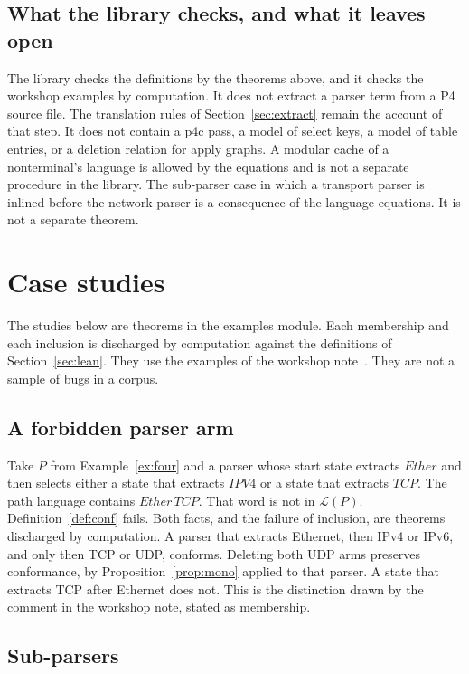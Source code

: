 \documentclass[a4paper,UKenglish,cleveref,autoref]{lipics-v2021}
\begin{document}
\subsection{What the library checks, and what it leaves open}

The library checks the definitions by the theorems above, and it checks the workshop examples by computation.
It does not extract a parser term from a P4 source file.
The translation rules of Section~\ref{sec:extract} remain the account of that step.
It does not contain a p4c pass, a model of select keys, a model of table entries, or a deletion relation for apply graphs.
A modular cache of a nonterminal's language is allowed by the equations and is not a separate procedure in the library.
The sub-parser case in which a transport parser is inlined before the network parser is a consequence of the language equations.
It is not a separate theorem.

\section{Case studies}
\label{sec:cases}

The studies below are theorems in the examples module.
Each membership and each inclusion is discharged by computation against the definitions of Section~\ref{sec:lean}.
They use the examples of the workshop note~\cite{yuan2025fmano}.
They are not a sample of bugs in a corpus.

\subsection{A forbidden parser arm}

Take \(P\) from Example~\ref{ex:four} and a parser whose start state extracts \(\mathit{Ether}\) and then selects either a state that extracts \(\mathit{IPV4}\) or a state that extracts \(\mathit{TCP}\).
The path language contains \(\mathit{Ether}\,\mathit{TCP}\).
That word is not in \(\mathcal{L}(P)\).
Definition~\ref{def:conf} fails.
Both facts, and the failure of inclusion, are theorems discharged by computation.
A parser that extracts Ethernet, then IPv4 or IPv6, and only then TCP or UDP, conforms.
Deleting both UDP arms preserves conformance, by Proposition~\ref{prop:mono} applied to that parser.
A state that extracts TCP after Ethernet does not.
This is the distinction drawn by the comment in the workshop note, stated as membership.

\subsection{Sub-parsers}
\end{document}
